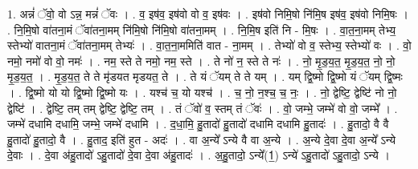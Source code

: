 \documentclass[17pt]{extarticle}
\begin{document}
1. अन्नं॑ ॅवो॒ वो ऽन्न॒ मन्नं॑ ॅवः । . व॒ इष॑व॒ इष॑वो वो व॒ इष॑वः । . इष॑वो निमि॒षो नि॑मि॒ष इष॑व॒ इष॑वो निमि॒षः । . नि॒मि॒षो वा॑तना॒मं ॅवा॑तना॒मम् नि॑मि॒षो नि॑मि॒षो वा॑तना॒मम् । . नि॒मि॒ष इति॑ नि - मि॒षः । . वा॒त॒ना॒मम् तेभ्य॒ स्तेभ्यो॑ वातना॒मं ॅवा॑तना॒मम् तेभ्यः॑ । . वा॒त॒ना॒ममिति॑ वात - ना॒मम् । . तेभ्यो॑ वो व॒ स्तेभ्य॒ स्तेभ्यो॑ वः । . वो॒ नमो॒ नमो॑ वो वो॒ नमः॑ । . नम॒ स्ते ते नमो॒ नम॒ स्ते । . ते नो॑ न॒ स्ते ते नः॑ । . नो॒ मृ॒ड॒य॒त॒ मृ॒ड॒य॒त॒ नो॒ नो॒ मृ॒ड॒य॒त॒ । . मृ॒ड॒य॒त॒ ते ते मृ॑डयत मृडयत॒ ते । . ते यं ॅयम् ते ते यम् । . यम् द्वि॒ष्मो द्वि॒ष्मो यं ॅयम् द्वि॒ष्मः । . द्वि॒ष्मो यो यो द्वि॒ष्मो द्वि॒ष्मो यः । . यश्च॑ च॒ यो यश्च॑ । . च॒ नो॒ न॒श्च॒ च॒ नः॒ । . नो॒ द्वेष्टि॒ द्वेष्टि॑ नो नो॒ द्वेष्टि॑ । . द्वेष्टि॒ तम् तम् द्वेष्टि॒ द्वेष्टि॒ तम् । . तं ॅवो॑ व॒ स्तम् तं ॅवः॑ । . वो॒ जम्भे॒ जम्भे॑ वो वो॒ जम्भे᳚ । . जम्भे॑ दधामि दधामि॒ जम्भे॒ जम्भे॑ दधामि । . द॒धा॒मि॒ हु॒तादो॑ हु॒तादो॑ दधामि दधामि हु॒तादः॑ । . हु॒तादो॒ वै वै हु॒तादो॑ हु॒तादो॒ वै । . हु॒ताद॒ इति॑ हुत - अदः॑ । . वा अ॒न्ये᳚ ऽन्ये वै वा अ॒न्ये । . अ॒न्ये दे॒वा दे॒वा अ॒न्ये᳚ ऽन्ये दे॒वाः । . दे॒वा अ॑हु॒तादो॑ ऽहु॒तादो॑ दे॒वा दे॒वा अ॑हु॒तादः॑ । . अ॒हु॒तादो॒ ऽन्ये᳚(1॒) ऽन्ये॑ ऽहु॒तादो॑ ऽहु॒तादो॒ ऽन्ये । \newline
\end{document}
